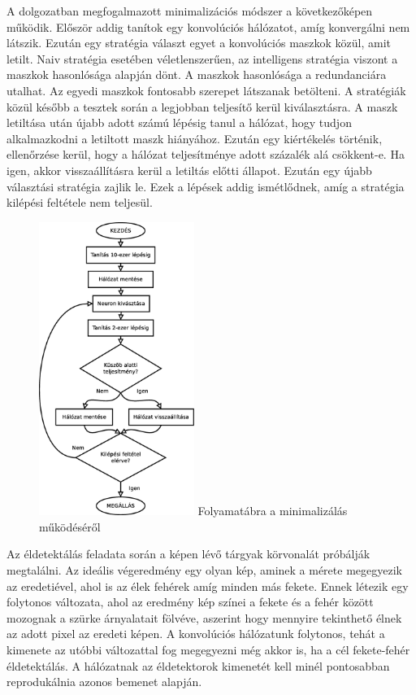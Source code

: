 \documentclass[12pt]{report}
\begin{document}
A dolgozatban megfogalmazott minimalizációs módszer a következőképen működik. Először addig tanítok egy konvolúciós hálózatot, amíg konvergálni nem látszik. Ezután egy stratégia választ egyet a konvolúciós maszkok közül, amit letilt. Naiv stratégia esetében véletlenszerűen, az intelligens stratégia viszont a maszkok hasonlósága alapján dönt. A maszkok hasonlósága a redundanciára utalhat. Az egyedi maszkok fontosabb szerepet látszanak betölteni. A stratégiák közül később a tesztek során a legjobban teljesítő kerül kiválasztásra. A maszk letiltása után újabb adott számú lépésig tanul a hálózat, hogy tudjon alkalmazkodni a letiltott maszk hiányához. Ezután egy kiértékelés történik, ellenőrzése kerül, hogy a hálózat teljesítménye adott százalék alá csökkent-e. Ha igen, akkor visszaállításra kerül a letiltás előtti állapot. Ezután egy újabb választási stratégia zajlik le. Ezek a lépések addig ismétlődnek, amíg a stratégia kilépési feltétele nem teljesül.

\begin{figure}
	\includegraphics[width=0.45\textwidth]{dia/folyam.eps}
	Folyamatábra a minimalizálás működéséről
\end{figure}

Az éldetektálás feladata során a képen lévő tárgyak körvonalát próbálják megtalálni. Az ideális végeredmény egy olyan kép, aminek a mérete megegyezik az eredetiével, ahol is az élek fehérek amíg minden más fekete. Ennek létezik egy folytonos változata, ahol az eredmény kép színei a fekete és a fehér között mozognak a szürke árnyalatait fölvéve, aszerint hogy mennyire tekinthető élnek az adott pixel az eredeti képen. A konvolúciós hálózatunk folytonos, tehát a kimenete az utóbbi változattal fog megegyezni még akkor is, ha a cél fekete-fehér éldetektálás. A hálózatnak az éldetektorok kimenetét kell minél pontosabban reprodukálnia azonos bemenet alapján.
\end{document}
